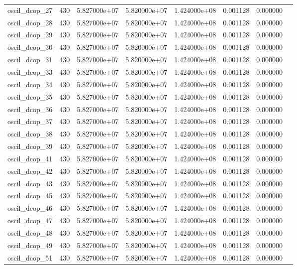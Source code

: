 \begin{tabular}{llrrrrrr}
oscil\_dcop\_27           &  430 &  5.827000e+07 &  5.820000e+07 &  1.424000e+08 &  0.001128 &  0.000000 \\
oscil\_dcop\_28           &  430 &  5.827000e+07 &  5.820000e+07 &  1.424000e+08 &  0.001128 &  0.000000 \\
oscil\_dcop\_29           &  430 &  5.827000e+07 &  5.820000e+07 &  1.424000e+08 &  0.001128 &  0.000000 \\
oscil\_dcop\_30           &  430 &  5.827000e+07 &  5.820000e+07 &  1.424000e+08 &  0.001128 &  0.000000 \\
oscil\_dcop\_31           &  430 &  5.827000e+07 &  5.820000e+07 &  1.424000e+08 &  0.001128 &  0.000000 \\
oscil\_dcop\_33           &  430 &  5.827000e+07 &  5.820000e+07 &  1.424000e+08 &  0.001128 &  0.000000 \\
oscil\_dcop\_34           &  430 &  5.827000e+07 &  5.820000e+07 &  1.424000e+08 &  0.001128 &  0.000000 \\
oscil\_dcop\_35           &  430 &  5.827000e+07 &  5.820000e+07 &  1.424000e+08 &  0.001128 &  0.000000 \\
oscil\_dcop\_36           &  430 &  5.827000e+07 &  5.820000e+07 &  1.424000e+08 &  0.001128 &  0.000000 \\
oscil\_dcop\_37           &  430 &  5.827000e+07 &  5.820000e+07 &  1.424000e+08 &  0.001128 &  0.000000 \\
oscil\_dcop\_38           &  430 &  5.827000e+07 &  5.820000e+07 &  1.424000e+08 &  0.001128 &  0.000000 \\
oscil\_dcop\_39           &  430 &  5.827000e+07 &  5.820000e+07 &  1.424000e+08 &  0.001128 &  0.000000 \\
oscil\_dcop\_41           &  430 &  5.827000e+07 &  5.820000e+07 &  1.424000e+08 &  0.001128 &  0.000000 \\
oscil\_dcop\_42           &  430 &  5.827000e+07 &  5.820000e+07 &  1.424000e+08 &  0.001128 &  0.000000 \\
oscil\_dcop\_43           &  430 &  5.827000e+07 &  5.820000e+07 &  1.424000e+08 &  0.001128 &  0.000000 \\
oscil\_dcop\_45           &  430 &  5.827000e+07 &  5.820000e+07 &  1.424000e+08 &  0.001128 &  0.000000 \\
oscil\_dcop\_46           &  430 &  5.827000e+07 &  5.820000e+07 &  1.424000e+08 &  0.001128 &  0.000000 \\
oscil\_dcop\_47           &  430 &  5.827000e+07 &  5.820000e+07 &  1.424000e+08 &  0.001128 &  0.000000 \\
oscil\_dcop\_48           &  430 &  5.827000e+07 &  5.820000e+07 &  1.424000e+08 &  0.001128 &  0.000000 \\
oscil\_dcop\_49           &  430 &  5.827000e+07 &  5.820000e+07 &  1.424000e+08 &  0.001128 &  0.000000 \\
oscil\_dcop\_51           &  430 &  5.827000e+07 &  5.820000e+07 &  1.424000e+08 &  0.001128 &  0.000000 \\
\bottomrule
\end{tabular}
